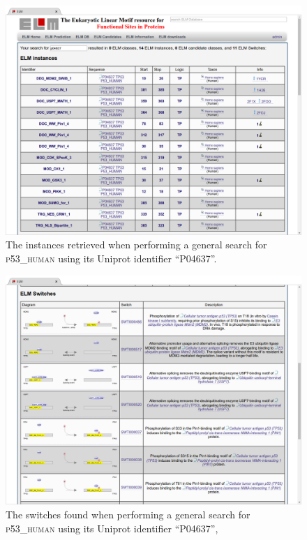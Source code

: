 \documentclass[12pt]{article}
\newcommand\uniprot[1]{%
	\textsc{\lowercase{#1}}%
}
\begin{document}
\begin{enumerate}

\begin{figure}[h!]
	\centering
	\includegraphics[width=\textwidth]{Figures/general_search/P04637_instances.png} 
	\caption{
		The instances retrieved when performing a general search for
		\uniprot{P53\_Human} using its Uniprot identifier ``P04637''.
	}
	\label{fig:general_search_P04637_instances}
\end{figure}

\begin{figure}[h!]
	\centering
	\includegraphics[width=\textwidth]{Figures/general_search/P04637_switches.png} 
	\caption{
		The switches found when performing a general search for
		\uniprot{P53\_Human} using its Uniprot identifier ``P04637'',
	}
	\label{fig:general_search_P04637_switches}
\end{figure}



\end{enumerate}
\end{document}
